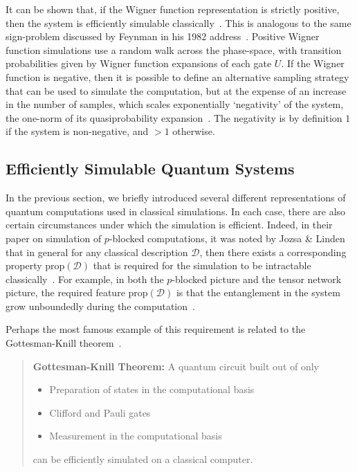 It can be shown that, if the Wigner function representation is strictly positive, then the system is efficiently simulable classically~\cite{Bartlett2002,Mari2012}. This is analogous to the same sign-problem discussed by Feynman in his 1982 address~\cite{Feynman1982}. Positive Wigner function simulations use a random walk across the phase-space, with transition probabilities given by Wigner function expansions of each gate $U$. If the Wigner function is negative, then it is possible to define an alternative sampling strategy that can be used to simulate the computation, but at the expense of an increase in the number of samples, which scales exponentially `negativity' of the system, the one-norm of its quasiprobability expansion~\cite{Pashayan2015}. The negativity is by definition $1$ if the system is non-negative, and $>1$ otherwise.
\subsection{Efficiently Simulable Quantum Systems}\label{sec:intro_efficient_simulations}
In the previous section, we briefly introduced several different representations of quantum computations used in classical simulations. In each case, there are also certain circumstances under which the simulation is efficient. Indeed, in their paper on simulation of $p$-blocked computations, it was noted by Jozsa \& Linden that in general for any classical description $\mathcal{D}$, then there exists a corresponding property $\text{prop}\left(\mathcal{D}\right)$ that is required for the simulation to be intractable classically~\cite{Jozsa2003}. For example, in both the $p$-blocked picture and the tensor network picture, the required feature $\text{prop}\left(\mathcal{D}\right)$ is that the entanglement in the system grow unboundedly during the computation~\cite{Jozsa2003,Vidal2003}.\par
Perhaps the most famous example of this requirement is related to the Gottesman-Knill theorem~\cite{Jozsa2003,Gottesman1998b}.
\begin{quote}
\textbf{Gottesman-Knill Theorem:} A quantum circuit built out of only 
\begin{itemize}
    \item Preparation of states in the computational basis
    \item Clifford and Pauli gates
    \item Measurement in the computational basis
\end{itemize}
can be efficiently simulated on a classical computer.
\end{quote}
